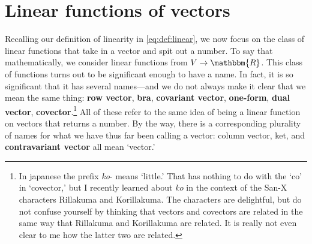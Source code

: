 \documentclass[
  11pt,
	colorful,
	raggedright,
]{tufte-style-thesis-flip}
\begin{document}
\section{Linear functions of vectors}

Recalling our definition of linearity in \eqref{eq:def:linear}, we now focus on the class of linear functions that take in a vector and spit out a number. To say that mathematically, we consider linear functions from $V\to \mathbbm{R}$. This class of functions turns out to be significant enough to have a name. In fact, it is so significant that it has several names---and we do not always make it clear that we mean the same thing: \textbf{row vector}, \textbf{bra}, \textbf{covariant vector}, \textbf{one-form}, \textbf{dual vector}, \textbf{covector}.\footnote{In japanese the prefix \emph{ko}- means `little.' That has nothing to do with the `co' in `covector,' but I recently learned about \emph{ko} in the context of the San-X characters Rillakuma and Korillakuma. The characters are delightful, but do not confuse yourself by thinking that vectors and covectors are related in the same way that Rillakuma and Korillakuma are related. It is really not even clear to me how the latter two are related.} All of these refer to the same idea of being a linear function on vectors that returns a number. By the way, there is a corresponding plurality of names for what we have thus far been calling a vector: column vector, ket, and \textbf{contravariant vector} all mean `vector.' 
\end{document}
